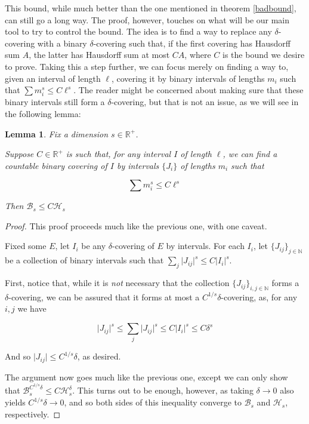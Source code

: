 \documentclass[11pt]{amsart}
\newcommand{\R}{\mathbb{R}}
\newcommand{\N}{\mathbb{N}}
\newcommand{\HH}{\mathcal{H}}
\newcommand{\BB}{\mathcal{B}}
\newtheorem{lemma}{Lemma}
\begin{document}
This bound, while much better than the one mentioned in theorem \ref{badbound}, can still go a long way. The proof, however, touches on what will be our main tool to try to control the bound. The idea is to find a way to replace any $\delta$-covering with a binary $\delta$-covering such that, if the first covering has Hausdorff sum $A$, the latter has Hausdorff sum at most $CA$, where $C$ is the bound we desire to prove. Taking this a step further, we can focus merely on finding a way to, given an interval of length $\ell$, covering it by binary intervals of lengths $m_i$ such that $\sum m_i^s \leq C \ell^s$. The reader might be concerned about making sure that these binary intervals still form a $\delta$-covering, but that is not an issue, as we will see in the following lemma:

\begin{lemma}
Fix a dimension $s \in \R^+$.

Suppose $C \in \R^+$ is such that, for any interval $I$ of length $\ell$, we can find a countable binary covering of $I$ by intervals $\{J_i\}$ of lengths $m_i$ such that

\[\sum m_i^s \leq C \ell^s\]

Then $\BB_s \leq C \HH_s$
\end{lemma}

\begin{proof}
This proof proceeds much like the previous one, with one caveat.

Fixed some $E$, let $I_i$ be any $\delta$-covering of $E$ by intervals. For each $I_i$, let $\{J_{ij}\}_{j \in \N}$ be a collection of binary intervals such that  $\sum_j \lvert J_{ij} \rvert^s \leq C \lvert I_i \rvert^s$.

First, notice that, while it is \emph{not} necessary that the collection $\{J_{ij}\}_{i,j \in \N}$ forms a $\delta$-covering, we can be assured that it forms at most a $C^{1/s}\delta$-covering, as, for any $i, j$ we have

\[ \lvert J_{ij} \rvert^s \leq \sum_j \lvert J_{ij} \rvert^s \leq C \lvert I_i \rvert^s \leq C \delta^s\]

And so $\lvert J_{ij} \rvert \leq C^{1/s} \delta$, as desired.

The argument now goes much like the previous one, except we can only show that $\BB_s^{C^{1/s} \delta} \leq C \HH_s^\delta$. This turns out to be enough, however, as taking $\delta \to 0$ also yields $C^{1/s} \delta \to 0$, and so both sides of this inequality converge to $\BB_s$ and $\HH_s$, respectively.
\end{proof}
\end{document}
